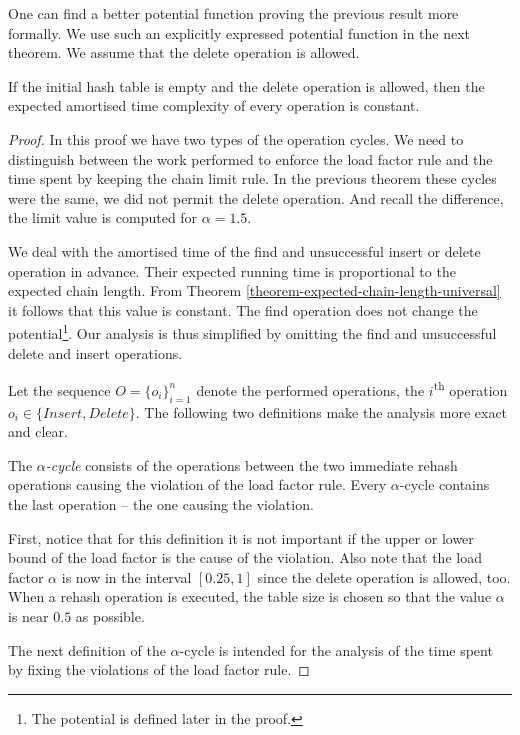 One can find a better potential function proving the previous result more formally. We use such an explicitly expressed potential function in the next theorem. We assume that the delete operation is allowed.
\begin{theorem}
\label{theorem-delete-time}
If the initial hash table is empty and the delete operation is allowed, then the expected amortised time complexity of every operation is constant.
\end{theorem}
\begin{proof}
In this proof we have two types of the operation cycles. We need to distinguish between the work performed to enforce the load factor rule and the time spent by keeping the chain limit rule. In the previous theorem these cycles were the same, we did not permit the delete operation. And recall the difference, the limit value is computed for $\alpha = 1.5$.

We deal with the amortised time of the find and unsuccessful insert or delete operation in advance. Their expected running time is proportional to the expected chain length. From Theorem \ref{theorem-expected-chain-length-universal} it follows that this value is constant. The find operation does not change the potential\footnote{The potential is defined later in the proof.}. Our analysis is thus simplified by omitting the find and unsuccessful delete and insert operations.

Let the sequence $O = \{o_i\}_{i=1}^{n}$ denote the performed operations, the $i$\textsuperscript{th} operation $o_i \in \lbrace Insert, Delete \rbrace$. The following two definitions make the analysis more exact and clear.

\begin{definition}
The \emph{$\alpha$-cycle} consists of the operations between the two immediate rehash operations causing the violation of the load factor rule. Every $\alpha$-cycle contains the last operation -- the one causing the violation.
\end{definition}
First, notice that for this definition it is not important if the upper or lower bound of the load factor is the cause of the violation. Also note that the load factor $\alpha$ is now in the interval $\left[0.25, 1\right]$ since the delete operation is allowed, too. When a rehash operation is executed, the table size is chosen so that the value $\alpha$ is near $0.5$ as possible. 

The next definition of the $\alpha$-cycle is intended for the analysis of the time spent by fixing the violations of the load factor rule.


\end{proof}
